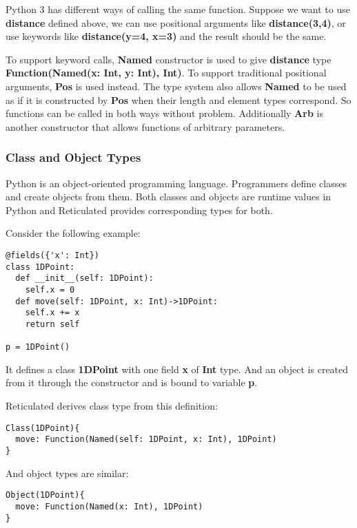 Python 3 has different ways of calling the same function.
Suppose we want to use \textbf{distance} defined above,
we can use positional arguments like \textbf{distance(3,4)},
or use keywords like \textbf{distance(y=4, x=3)} and the result should be the same.

To support keyword calls, \textbf{Named} constructor is used to give
\textbf{distance} type \textbf{Function(Named(x: Int, y: Int), Int)}.
To support traditional positional arguments, \textbf{Pos} is used instead.
The type system also allows \textbf{Named} to be used as if it is constructed by \textbf{Pos}
when their length and element types correspond. So functions can be called in both
ways without problem. Additionally \textbf{Arb} is another constructor
that allows functions of arbitrary parameters.

\subsubsection{Class and Object Types}

Python is an object-oriented programming language.
Programmers define classes and create objects from them.
Both classes and objects are runtime values in Python
and Reticulated provides corresponding types for both.

Consider the following example:

\begin{verbatim}
@fields({'x': Int})
class 1DPoint:
  def __init__(self: 1DPoint):
    self.x = 0
  def move(self: 1DPoint, x: Int)->1DPoint:
    self.x += x
    return self

p = 1DPoint()
\end{verbatim}

It defines a class \textbf{1DPoint} with one field \textbf{x} of \textbf{Int} type.
And an object is created from it through the constructor
and is bound to variable \textbf{p}.

Reticulated derives class type from this definition:

\begin{verbatim}
Class(1DPoint){
  move: Function(Named(self: 1DPoint, x: Int), 1DPoint)
}
\end{verbatim}

And object types are similar:

\begin{verbatim}
Object(1DPoint){
  move: Function(Named(x: Int), 1DPoint)
}
\end{verbatim}

